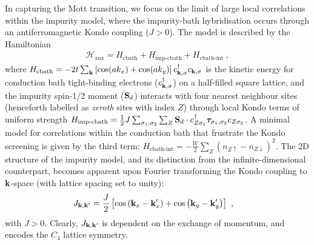 \documentclass[%
 reprint,
superscriptaddress,
groupedaddress,
 amsmath,amssymb,
 aps,
prl
]{revtex4-2}
\begin{document}
In capturing the Mott transition, we focus on the %
limit of large local correlations within the impurity model, where the impurity-bath hybridisation occurs through an antiferromagnetic Kondo coupling ($J>0$). The model is described by the Hamiltonian
\begin{equation}\begin{aligned}\label{impurityModel}
	\mathcal{H}_\text{aux} = H_\text{cbath} + H_\text{imp-cbath} + H_\text{cbath-int}~,
\end{aligned}\end{equation}
where $H_\text{cbath} = -2t\sum_{{\bf k}}\left[\cos(ak_x) + \cos(ak_y)\right] c^\dagger_{{\bf k},\sigma}c_{{\bf k},\sigma}$ is the kinetic energy for conduction bath tight-binding electrons ($c^\dagger_{{\bf k},\sigma}$) on a half-filled square lattice, and the impurity spin-1/2 moment (${\bf S}_d$) interacts with four nearest neighbour sites (henceforth labelled as \textit{zeroth} sites with index $Z$) 
through local Kondo terms of uniform strength \(H_\text{imp-cbath} =\frac{1}{2} J\sum_{\sigma_1,\sigma_2}\sum_{Z} {\bf S}_d\cdot c^\dagger_{Z\sigma_1}{\boldsymbol \tau}_{\sigma_1,\sigma_2} c_{Z\sigma_2}\).
A minimal model for correlations within the conduction bath that frustrate the Kondo screening is given by the third term:
\(H_\text{cbath-int} = -\frac{W}{2}\sum_{Z} \left(n_{Z\uparrow} - n_{Z\downarrow}\right)^2\). 
The 2D structure of the impurity model, and its distinction from the infinite-dimensional counterpart, becomes apparent upon Fourier transforming the Kondo coupling to ${\bf k}$-space (with lattice spacing set to unity):
\begin{equation}\begin{aligned}
	J_{{\bf k}, {\bf k}^\prime} = \frac{J}{2}&\left[\cos\left({\bf k}_x - {\bf k}^\prime_x\right) + \cos\left({\bf k}_y - {\bf k}^\prime_y\right)\right]~,
\end{aligned}\end{equation}
with $J>0$.
Clearly, $J_{{\bf k}, {\bf k}^\prime}$ is 
dependent on the exchange of momentum, and encodes the $C_{4}$ lattice symmetry. 
\end{document}
